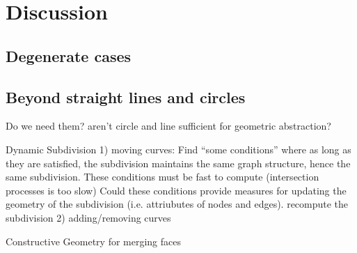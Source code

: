 \section{Discussion}

\subsection{Degenerate cases}

\subsection{Beyond straight lines and circles}
Do we need them? aren't circle and line sufficient for geometric abstraction?



Dynamic Subdivision
1) moving curves: Find ``some conditions'' where as long as they are satisfied, the subdivision maintains the same graph structure, hence the same subdivision.
These conditions must be fast to compute (intersection processes is too slow)
Could these conditions provide measures for updating the geometry of the subdivision (i.e. attriubutes of nodes and edges).
recompute the subdivision
2) adding/removing curves

Constructive Geometry
for merging faces 
